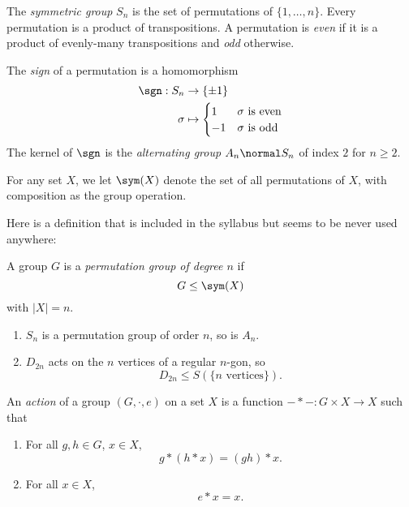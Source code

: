 \documentclass[a4paper]{article}
\theoremstyle{definition}
\begin{document}
The \emph{symmetric group} \(S_n\) is the set of permutations of \(\{1, \dots, n\}\). Every permutation is a product of transpositions. A permutation is \emph{even} if it is a product of evenly-many transpositions and \emph{odd} otherwise.

The \emph{sign} of a permutation is a homomorphism
\begin{align*}
  \sgn: S_n &\to \{\pm 1\} \\
  \sigma &\mapsto
           \begin{cases}
             1 & \sigma \text{ is even} \\
             -1 & \sigma \text{ is odd}
           \end{cases}
\end{align*}
The kernel of \(\sgn\) is the \emph{alternating group} \(A_n \normal S_n\) of index \(2\) for \(n \geq 2\).

For any set \(X\), we let \(\sym(X)\) denote the set of all permutations of \(X\), with composition as the group operation.

Here is a definition that is included in the syllabus but seems to be never used anywhere:

\begin{definition}
  A group \(G\) is a \emph{permutation group of degree \(n\)} if
  \[
    G \leq \sym(X)
  \]
  with \(|X| = n\).
\end{definition}

\begin{eg}\leavevmode
  \begin{enumerate}
  \item \(S_n\) is a permutation group of order \(n\), so is \(A_n\).
  \item \(D_{2n}\) acts on the \(n\) vertices of a regular \(n\)-gon, so
    \[
      D_{2n} \leq S(\{n \text{ vertices}\}).
    \]
  \end{enumerate}
\end{eg}

\begin{definition}
  An \emph{action} of a group \((G, \cdot, e)\) on a set \(X\) is a function \(- * - : G \times X \to X\) such that
  \begin{enumerate}
  \item For all \(g, h \in G\), \(x \in X\),
    \[
      g * (h * x) = (gh) * x.
    \]
  \item For all \(x \in X\),
    \[
      e * x = x.
    \]
  \end{enumerate}
\end{definition}
\end{document}
